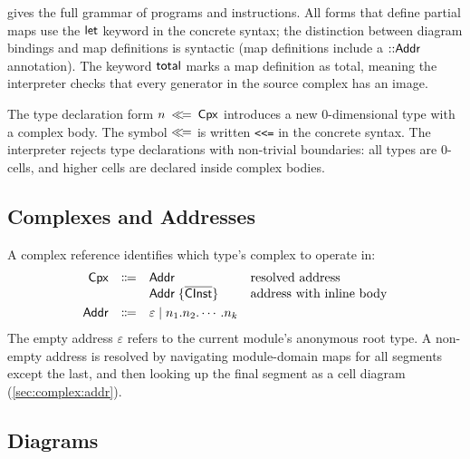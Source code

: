\documentclass[acmsmall,screen,nonacm]{acmart}
\begin{document}
 gives the full grammar of programs and
instructions. All forms that define partial maps use the $\mathsf{let}$ keyword
in the concrete syntax; the distinction between diagram bindings and map
definitions is syntactic (map definitions include a $\mathbin{::} \textsf{Addr}$
annotation). The keyword $\mathsf{total}$ marks a map definition as total,
meaning the interpreter checks that every generator in the source complex
has an image.

The type declaration form $n \;\mathbin{\ll\!=}\; \textsf{Cpx}$ introduces a new 0-dimensional
type with a complex body. The symbol $\mathbin{\ll\!=}$ is written \texttt{<<=} in
the concrete syntax. The interpreter rejects type declarations with
non-trivial boundaries: all types are 0-cells, and higher cells are
declared inside complex bodies.

\subsection{Complexes and Addresses}
\label{sec:syntax:cpx}

A complex reference identifies which type's complex to operate in:
\[
  \begin{array}{rcll}
    \textsf{Cpx}  & \Coloneqq & \textsf{Addr}
            & \text{resolved address} \\
          &           & \textsf{Addr}\;\{ \overline{\textsf{CInst}} \}
            & \text{address with inline body} \\[3pt]
    \textsf{Addr} & \Coloneqq & \varepsilon \mid n_1.n_2.\cdots.n_k
  \end{array}
\]
The empty address $\varepsilon$ refers to the current module's anonymous root
type. A non-empty address is resolved by navigating module-domain maps
for all segments except the last, and then looking up the final segment
as a cell diagram (\cref{sec:complex:addr}).

\subsection{Diagrams}
\label{sec:syntax:diag}
\end{document}
